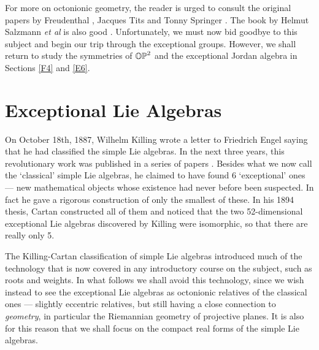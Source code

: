 For more on octonionic geometry, the reader is urged to consult the
original papers by Freudenthal
\cite{Freudenthal4,Freudenthal,Freudenthal2,Freudenthal3}, Jacques Tits
\cite{Tits,Tits2} and Tonny Springer
\cite{Springer,Springer2,Springer3}.  The book by Helmut Salzmann {\it
et al} is also good \cite{Salzmann}.  Unfortunately, we must now bid
goodbye to this subject and begin our trip through the exceptional
groups.  However, we shall return to study the symmetries of ${\mathbb {OP}}^2$ and
the exceptional Jordan algebra in Sections \ref{F4} and \ref{E6}.

\section{Exceptional Lie Algebras}         \label{lie}   
 
On October 18th, 1887, Wilhelm Killing wrote a letter to Friedrich Engel
saying that he had classified the simple Lie algebras.  In the next
three years, this revolutionary work was published in a series of papers
\cite{Killing}.  Besides what we now call the `classical' simple Lie
algebras, he claimed to have found 6 `exceptional' ones --- new
mathematical objects whose existence had never before been suspected. In
fact he gave a rigorous construction of only the smallest of these. In
his 1894 thesis, Cartan \cite{Cartan0} constructed all of them and
noticed that the two 52-dimensional exceptional Lie algebras discovered
by Killing were isomorphic, so that there are really only 5.

The Killing-Cartan classification of simple Lie algebras introduced much
of the technology that is now covered in any introductory course on the
subject, such as roots and weights.  In what follows we shall avoid this
technology, since we wish instead to see the exceptional Lie algebras as
octonionic relatives of the classical ones --- slightly eccentric relatives,
but still having a close connection to {\it geometry}, in particular the
Riemannian geometry of projective planes.  It is also for this reason
that we shall focus on the compact real forms of the simple Lie algebras.

